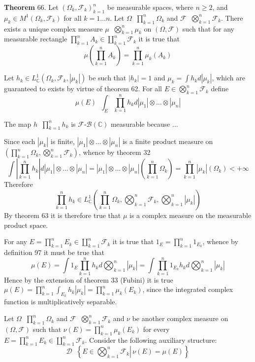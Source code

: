 \documentclass[a4paper]{article}
\newcommand{\obj}[1]{\left\{ #1 \right \}}
\newcommand{\brac}[1]{\left ( #1 \right )}
\newcommand{\induc}[1]{\left . #1 \right \vert}
\newcommand{\abs}[1]{\left | #1 \right |}
\newcommand{\Cplx}{\mathbb{C}}
\newcommand{\Dcal}{\mathcal{D}}
\newcommand{\Fcal}{\mathcal{F}}
\newcommand{\borel}[1]{\mathcal{B}\brac{#1}}
\newcommand{\defn}{\mathop{\overset{\Delta}{=}}\nolimits}
\begin{document}
\label{thm:cplx_prod_meas} \noindent \textbf{Theorem} 66.
Let $\brac{\Omega_k, \Fcal_k}_{k=1}^n$ be measurable spaces, where $n\geq2$, and $\mu_k \in M^1\brac{\Omega_k, \Fcal_k}$ for all $k=1\ldots n$. Let $\Omega\defn\prod_{k=1}^n \Omega_k$ and $\Fcal\defn \bigotimes_{k=1}^n \Fcal_k$. There exists a unique complex measure $\mu\defn\bigotimes_{k=1}^n \mu_k$ on $\brac{\Omega, \Fcal}$ such that for any measurable rectangle $\prod_{k=1}^n A_k \in \coprod_{k=1}^n \Fcal_k$ it is true that \[\mu\brac{\prod_{k=1}^n A_k} = \prod_{k=1}^n \mu_k\brac{A_k}\]

Let $h_k\in L^1_\Cplx\brac{\Omega_k,\Fcal_k,\abs{\mu_k}}$ be such that $\abs{h_k}=1$ and $\mu_k = \int h_k d\abs{\mu_k}$, which are guaranteed to exists by virtue of theorem 62. For all $E\in \bigotimes_{k=1}^n \Fcal_k$ define \[\mu\brac{E}\defn \int_E \prod_{k=1}^n h_k d\abs{\mu_1}\otimes\ldots\otimes\abs{\mu_n}\]

The map $h\defn \prod_{k=1}^n h_k$ is $\Fcal$-$\borel{\Cplx}$ measurable because $\dots$

Since each $\abs{\mu_k}$ is finite, $\abs{\mu_1}\otimes\ldots\otimes\abs{\mu_n}$ is a finite product measure on $\brac{\prod_{k=1}^n \Omega_k, \bigotimes_{k=1}^n \Fcal_k}$, whence by theorem 32 \[\int \abs{\prod_{k=1}^n h_k} d\abs{\mu_1}\otimes\ldots\otimes\abs{\mu_n} = \abs{\mu_1}\otimes\ldots\otimes\abs{\mu_n}\brac{\prod_{k=1}^n \Omega_k} = \prod_{k=1}^n \abs{\mu_k}\brac{\Omega_k}<+\infty\] Therefore \[\prod_{k=1}^n h_k\in L^1_\Cplx\brac{\prod_{k=1}^n \Omega_k, \bigotimes_{k=1}^n \Fcal_k, \bigotimes_{k=1}^n \abs{\mu_k} }\] By theorem 63 it is therefore true that $\mu$ is a complex measure on the measurable product space.

For any $E=\prod_{k=1}^n E_k\in \coprod_{k=1}^n \Fcal_k$ it is true that $1_E = \prod_{k=1}^n 1_{E_k}$, whence by definition 97 it must be true that \[\mu\brac{E}=\int 1_E \prod_{k=1}^n h_k d\bigotimes_{k=1}^n \abs{\mu_k} = \int \prod_{k=1}^n 1_{E_k} h_k d\bigotimes_{k=1}^n \abs{\mu_k}\] Hence by the extension of theorem 33 (Fubini) it is true $\mu\brac{E} = \prod_{k=1}^n \int_{E_k} h_k \abs{\mu_k} = \prod_{k=1}^n \mu_k\brac{E_k}$, since the integrated complex  function is multiplicatively separable.

Let $\Omega\defn\prod_{k=1}^n \Omega_k$ and $\Fcal\defn \bigotimes_{k=1}^n \Fcal_k$ and $\nu$ be another complex measure on $\brac{\Omega, \Fcal}$ such that $\nu\brac{E} = \prod_{k=1}^n \mu_k\brac{E_k}$ for every $E=\prod_{k=1}^n E_k \in \coprod_{k=1}^n \Fcal_k$. Consider the following auxiliary structure:\[\Dcal\defn \obj{ \induc{ E\in \bigotimes_{k=1}^n \Fcal_k }\, \nu\brac{E} = \mu\brac{E} }\]
\end{document}
